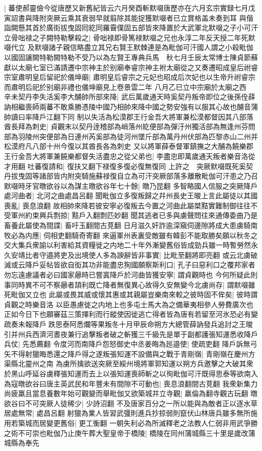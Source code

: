 |{
	蕃使郝靈儉今從唐歷又新舊紀皆云六月癸酉斬默啜唐歷亦在六月玄宗實録七月戊寅詔書與降附突厥云乘其衰弱早就翦除其能捉獲默啜者已立賞格盖未奏到耳}
與偕詣闕懸其首於廣街拔曳固囘紇同羅霫僕固五部皆來降置於大武軍北默啜之子小可汗立骨咄禄之子闕特勒擊殺之|{
	骨咄禄即骨篤禄默啜之兄也永淳二年反天授二年死默啜代立}
及默啜諸子親信略盡立其兄右賢王默棘連是為毗伽可汗國人謂之小殺毗伽以國固讓闕特勒闕特勒不受乃以為左賢王專典兵馬　秋七月壬辰太常博士陳貞節蘇獻以太廟七室已滿請遷中宗神主於别廟奉睿宗神主袝太廟從之又奏遷昭成皇后祔睿宗室肅明皇后留祀於儀坤廟|{
	肅明皇后睿宗之元妃也昭成后次妃也以生帝升祔睿宗而肅明后祀於别廟非禮也儀坤廟見上卷景雲二年}
八月乙巳立中宗廟於太廟之西　辛未契丹李失活奚李大酺帥所部來降|{
	武后萬歲通天時奚契丹叛帝即位之後孫佺薛訥相繼喪師兩蕃不敢乘勝憑陵中國乃相帥來降中國之勢安強有以服其心故也酺音蒲帥讀曰率降戶江翻下同}
制以失活為松漠郡王行金吾大將軍兼松漠都督因其八部落酋長拜為刺史|{
	貞觀末以契丹逹稽部為峭落州紇便部為彈汙州獨活部為無逢州芬問部為羽陵州突便部為日連州芮奚部為徒河州墜斤部為萬丹州伏部為匹黎赤山二州并松漠府凡八部十州今復以其酋長各為刺史}
又以將軍薛泰督軍鎮撫之大酺為饒樂郡王行金吾大將軍兼饒樂都督失活盡忠之從父弟也|{
	李盡忠即萬歲通天叛者樂音洛從才用翻}
吐蕃復請和|{
	復扶又翻下禄復多復必復無復同}
上許之　突厥默啜既死奚契丹拔曳固等諸部皆内附突騎施蘇禄復自立為可汗突厥部落多離散毗伽可汗患之乃召默啜時牙官暾欲谷以為謀主暾欲谷年七十餘|{
	暾乃昆翻}
多智略國人信服之突厥降戶處河曲者|{
	北河之曲處昌呂翻}
聞毗伽立多復叛歸之幷州長史王晙上言此屬徒以其國喪亂|{
	喪息浪翻}
故相帥來降若彼安寧必復叛去今置之河曲此屬桀黠實難制御往往不受軍州約束興兵剽掠|{
	黠戶入翻剽匹妙翻}
聞其逃者已多與虜聲問往來通傳委曲乃是畜養此屬使為間諜|{
	畜吁玉翻間古莧翻}
日月滋久奸詐逾深窺伺邊隙將成大患虜騎南牧必為内應|{
	伺相吏翻騎奇寄翻}
來逼軍州表裏受敵雖有韓彭不能取勝矣願以秋冬之交大集兵衆諭以利害給其資糧徙之内地二十年外漸變舊俗皆成勁兵雖一時暫勞然永久安靖比者守邉將吏及出境使人多為諛辭皆非事實|{
	比毗至翻將即亮翻}
或云北虜破滅或云降戶妥帖皆欲自衒其功非能盡忠狥國願察斯利口|{
	孔子曰惡利口之覆邦家者}
勿忘遠慮議者必曰國家曏時已嘗寘降戶於河曲皆獲安寧|{
	謂貞觀時也}
今何所疑此則事同時異不可不察曏者頡利既亡降者無復異心故得久安無變今北虜尚存|{
	謂默啜雖死毗伽又立也}
此屬或畏其威或懷其惠或其親屬豈樂南來較之彼時固不侔矣|{
	彼時謂貞觀之時樂音洛}
以臣愚慮徙之内地上也多屯士馬大為之備華夷相參人勞費廣次也正如今日下也願審茲三策擇利而行縱使因徙逃亡得者皆為唐有若留至河氷恐必有變疏奏未報降戶跌思泰阿悉爛等果叛冬十月甲辰命朔方大總管薛訥發兵追討之王晙引并州兵西濟河晝夜兼行追擊叛者破之斬獲三千級先是單于副都護張知運悉收降戶兵仗|{
	先悉薦翻}
令度河而南降戶怨怒御史中丞姜晦為廵邉使|{
	使疏吏翻}
降戶訴無弓矢不得射獵晦悉還之降戶得之遂叛張知運不設備與之戰于青剛嶺|{
	青剛嶺在慶州方渠縣北靈州之南}
為虜所擒欲送突厥至綏州境將軍郭知運以朔方兵邀擊之大破其衆於黑山呼延谷虜釋張知運而去上以張知運喪師斬之以徇毗伽可汗既得思泰等欲南入為寇暾欲谷曰唐主英武民和年豐未有間隙不可動也|{
	喪息浪翻間古莧翻}
我衆新集力尚疲羸且當息養數年始可觀變而舉毗伽又欲築城并立寺觀|{
	羸倫為翻寺觀古玩翻}
暾欲谷曰不可突厥人徒稀少|{
	少詩沼翻}
不及唐家百分之一所以能與為敵者正以逐水草居處無常|{
	處昌呂翻}
射獵為業人皆習武彊則進兵抄掠弱則竄伏山林唐兵雖多無所施用若築城而居變更舊俗|{
	更工衡翻}
一朝失利必為所滅釋老之法教人仁弱非用武爭勝之術不可崇也毗伽乃止庚午葬大聖皇帝于橋陵|{
	橋陵在同州蒲城縣三十里是歲改蒲城縣為奉先}


